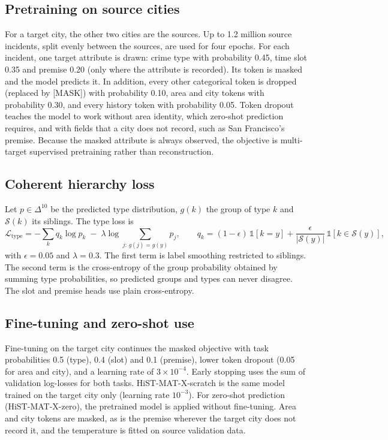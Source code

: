 \documentclass[11pt]{article}
\newcommand{\HMX}{HiST-MAT-X}
\begin{document}
\subsection{Pretraining on source cities}
For a target city, the other two cities are the sources. Up to 1.2 million source incidents, split evenly between the sources, are used for four epochs. For each incident, one target attribute is drawn: crime type with probability 0.45, time slot 0.35 and premise 0.20 (only where the attribute is recorded). Its token is masked and the model predicts it. In addition, every other categorical token is dropped (replaced by [MASK]) with probability 0.10, area and city tokens with probability 0.30, and every history token with probability 0.05. Token dropout teaches the model to work without area identity, which zero-shot prediction requires, and with fields that a city does not record, such as San Francisco's premise. Because the masked attribute is always observed, the objective is multi-target supervised pretraining rather than reconstruction.

\subsection{Coherent hierarchy loss}
Let $p\in\Delta^{10}$ be the predicted type distribution, $g(k)$ the group of type $k$ and $\mathcal{S}(k)$ its siblings. The type loss is
\begin{equation}
\mathcal{L}_{\text{type}} = -\sum_{k} q_k \log p_k \;-\; \lambda \log \sum_{j:\,g(j)=g(y)} p_j,
\qquad q_k = (1-\epsilon)\,\mathbb{1}[k=y] + \frac{\epsilon}{|\mathcal{S}(y)|}\,\mathbb{1}[k\in\mathcal{S}(y)],
\label{eq:hier}
\end{equation}
with $\epsilon=0.05$ and $\lambda=0.3$. The first term is label smoothing \citep{szegedy2016} restricted to siblings. The second term is the cross-entropy of the group probability obtained by summing type probabilities, so predicted groups and types can never disagree. The slot and premise heads use plain cross-entropy.

\subsection{Fine-tuning and zero-shot use}
Fine-tuning on the target city continues the masked objective with task probabilities 0.5 (type), 0.4 (slot) and 0.1 (premise), lower token dropout (0.05 for area and city), and a learning rate of $3\times10^{-4}$. Early stopping uses the sum of validation log-losses for both tasks. \HMX{}-scratch is the same model trained on the target city only (learning rate $10^{-3}$). For zero-shot prediction (\HMX{}-zero), the pretrained model is applied without fine-tuning. Area and city tokens are masked, as is the premise wherever the target city does not record it, and the temperature is fitted on source validation data.
\end{document}
